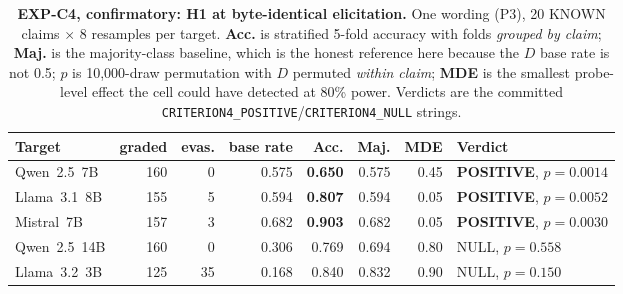 \begin{table}[h]
\centering
\begin{small}
\caption{\textbf{EXP-C4, confirmatory: H1 at byte-identical elicitation.} One wording (P3), 20 KNOWN claims $\times$ 8 resamples per target. \textbf{Acc.} is stratified 5-fold accuracy with folds \emph{grouped by claim}; \textbf{Maj.} is the majority-class baseline, which is the honest reference here because the $D$ base rate is not 0.5; \textbf{$p$} is 10,000-draw permutation with $D$ permuted \emph{within claim}; \textbf{MDE} is the smallest probe-level effect the cell could have detected at 80\% power. Verdicts are the committed \texttt{CRITERION4\_POSITIVE}/\texttt{CRITERION4\_NULL} strings.}
\label{tab:crit4_ours_h1}
\setlength{\tabcolsep}{4pt}
\begin{tabular}{@{}lrrrrrrl@{}}
\toprule
\textbf{Target} & \textbf{graded} & \textbf{evas.} & \textbf{base rate} & \textbf{Acc.} & \textbf{Maj.} & \textbf{MDE} & \textbf{Verdict} \\
\midrule
Qwen~2.5~7B  & 160 & 0  & 0.575 & \textbf{0.650} & 0.575 & 0.45 & \textbf{POSITIVE}, $p\!=\!0.0014$ \\
Llama~3.1~8B & 155 & 5  & 0.594 & \textbf{0.807} & 0.594 & 0.05 & \textbf{POSITIVE}, $p\!=\!0.0052$ \\
Mistral~7B   & 157 & 3  & 0.682 & \textbf{0.903} & 0.682 & 0.05 & \textbf{POSITIVE}, $p\!=\!0.0030$ \\
Qwen~2.5~14B & 160 & 0  & 0.306 & 0.769 & 0.694 & 0.80 & NULL, $p\!=\!0.558$ \\
Llama~3.2~3B & 125 & 35 & 0.168 & 0.840 & 0.832 & 0.90 & NULL, $p\!=\!0.150$ \\
\bottomrule
\end{tabular}
\end{small}
\end{table}

